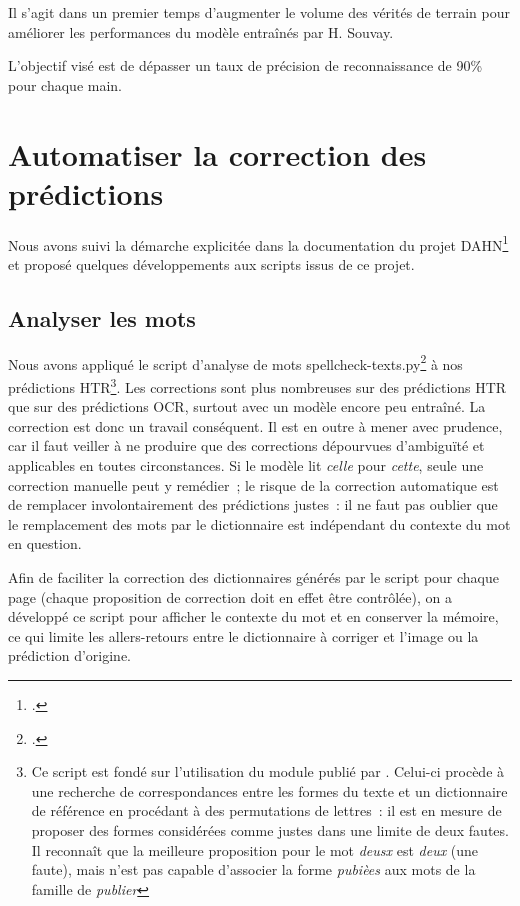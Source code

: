 \documentclass[a4paper,12pt,twoside]{book}
\begin{document}
			Il s'agit dans un premier temps d'augmenter le volume des vérités de terrain pour améliorer les performances du modèle entraînés par H. Souvay.
			
			L'objectif visé est de dépasser un taux de précision de reconnaissance de 90\% pour chaque main.
	
		\section{Automatiser la correction des prédictions}
			Nous avons suivi la démarche explicitée dans la documentation du projet DAHN\footcite{chiffoleauHowPostOCRCorrection2022} et proposé quelques développements aux scripts issus de ce projet.
					
			\subsection{Analyser les mots}
				Nous avons appliqué le script d'analyse de mots \textsf{spellcheck-texts.py}\footcite{biaySpellcheckTextsPy2022} à nos prédictions HTR\footnote{Ce script est fondé sur l'utilisation du module publié par  \cite{barrusPyspellcheckerPurePython}. Celui-ci procède à une recherche de correspondances entre les formes du texte et un dictionnaire de référence en procédant à des permutations de lettres~: il est en mesure de proposer des formes considérées comme justes dans une limite de deux fautes. Il reconnaît que la meilleure proposition pour le mot \textit{deusx} est \textit{deux} (une faute), mais n'est pas capable d'associer la forme \textit{pubièes} aux mots de la famille de \textit{publier}}. Les corrections sont plus nombreuses sur des prédictions HTR que sur des prédictions OCR, surtout avec un modèle encore peu entraîné. La correction est donc un travail conséquent. Il est en outre à mener avec prudence, car il faut veiller à ne produire que des corrections dépourvues d'ambiguïté et applicables en toutes circonstances. Si le modèle lit \textit{celle} pour \textit{cette}, seule une correction manuelle peut y remédier~; le risque de la correction automatique est de remplacer involontairement des prédictions justes~: il ne faut pas oublier que le remplacement des mots par le dictionnaire est indépendant du contexte du mot en question.
				
				Afin de faciliter la correction des dictionnaires générés par le script pour chaque page (chaque proposition de correction doit en effet être contrôlée), on a développé ce script pour afficher le contexte du mot et en conserver la mémoire, ce qui limite les allers-retours entre le dictionnaire à corriger et l'image ou la prédiction d'origine.
				
\end{document}
